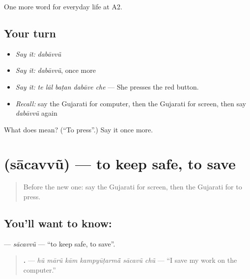 \begin{grammarlens}[title={What you've built}]
One more word for everyday life at A2.
\end{grammarlens}

\subsection*{Your turn}
\begin{itemize}
\raggedright
  \item \emph{Say it:} \emph{dabāvvũ}
  \item \emph{Say it:} \emph{dabāvvũ}, once more
  \item \emph{Say it:} \emph{te lāl baṭan dabāve che} — She presses the red button.
  \item \emph{Recall:} say the Gujarati for computer, then the Gujarati for screen, then say \emph{dabāvvũ} again
\end{itemize}

\begin{tcolorbox}[breakable,colback=teal!4,colframe=teal!35!black,title={Before you move on}]
What does  mean? (\textquotedblleft{}To press\textquotedblright{}.) Say it once more.
\end{tcolorbox}
\section[\texorpdfstring{\gu{સાચવવું} (sācavvũ)}{સાચવવું (sācavvũ)}]{ (sācavvũ) — to keep safe, to save}

\label{lesson:GU-C250-sacavvu}



\begin{quote}
Before the new one: say the Gujarati for screen, then the Gujarati for to press.
\end{quote}

\subsection*{You'll want to know: }
\textbf{} — \emph{sācavvũ} — \textquotedblleft{}to keep safe, to save\textquotedblright{}.

\begin{quote}
\textbf{     .} — \emph{hũ mārũ kām kampyūṭarmā̃ sācavũ chũ} — \textquotedblleft{}I save my work on the computer.\textquotedblright{}
\end{quote}

